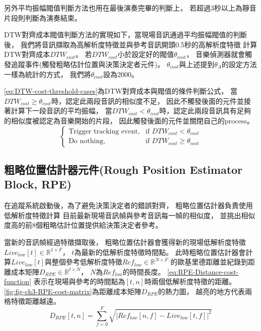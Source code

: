 \documentclass[class=NCU_thesis, crop=false]{standalone}
\begin{document}
另外平均振幅閥值判斷方法也用在最後演奏完畢的判斷上，
若超過3秒以上為靜音片段則判斷為演奏結束。

DTW對齊成本閥值判斷方法的實現如下，當現場音訊通過平均振幅閥值的判斷後，
我們將音訊擷取為高解析度特徵並與參考音訊開頭0.5秒的高解析度特徵
計算DTW對齊成本${DTW_{cost}}$。
若${DTW_{cost}}$小於設定好的閥值$\theta _{cost}$，
音樂偵測器就會觸發追蹤事件(觸發粗略估計位置與決策決定者元件)。
$\theta _{cost}$與上述提到$\theta _{A}$的設定方法一樣為統計的方式，
我們將$\theta _{cost}$設為2000。

\cref{eq:DTW-cost-threshold-cases}為DTW對齊成本與閥值的條件判斷公式，
當$DTW_{cost} \geq \theta _{cost}$時，認定此兩段音訊的相似度不足，
因此不觸發後面的元件並接著計算下一段音訊的平均振幅，
當$DTW_{cost}  < \theta _{cost}$時，認定此兩段音訊具有足夠的相似度被認定為音樂開始的片段，
因此觸發後面的元件並關閉自己的process。
\begin{equation}
    \label{eq:DTW-cost-threshold-cases}
    \begin{cases}
        \text{Trigger tracking event}, & \text{if $DTW_{cost} < \theta _{cost}$} \\
        \text{Do nothing}, & \text{if $DTW_{cost} \geq \theta _{cost}$}
    \end{cases}
\end{equation}

\subsection{粗略位置估計器元件(Rough Position Estimator Block, RPE)} \label{ch3-subst-RPE}
在追蹤系統啟動後，為了避免決策決定者的錯誤對齊，
粗略位置估計器負責使用低解析度特徵計算
目前最新現場音訊幀與參考音訊每一幀的相似度，
並挑出相似度高的前8個粗略估計位置提供給決策決定者參考。

當新的音訊幀經過特徵擷取後，
粗略位置估計器會獲得新的現場低解析度特徵$Live_{low}[t] \in \mathbb{R}^{1 \times F}$，
$t$為最新的低解析度特徵時間點。
此時粗略位置估計器會計算$Live_{low}[t]$與整個參考低解析度特徵$Ref_{low} \in \mathbb{R}^{N \times F}$
的歐基里德距離並紀錄到距離成本矩陣$D_{RPE} \in \mathbb{R}^{t \times N}$，
$N$為$Ref_{low}$的時間長度。
\cref{eq:RPE-Distance-cost-function}
表示在現場與參考的時間點為$[t, n]$時兩個低解析度特徵的距離。
\cref{fig:fig-ch3-RPE-cost-matrix}為距離成本矩陣$D_{RPE}$的熱力圖，
越亮的地方代表兩格特徵距離越遠。
\begin{equation}
    \label{eq:RPE-Distance-cost-function}
    D_{RPE}[t, n] = \sum_{f = 0}^{F}\sqrt{
    \left\lvert Ref_{low}[n, f]-Live_{low}[t, f]\right\rvert^{2}} 
\end{equation}
\end{document}
